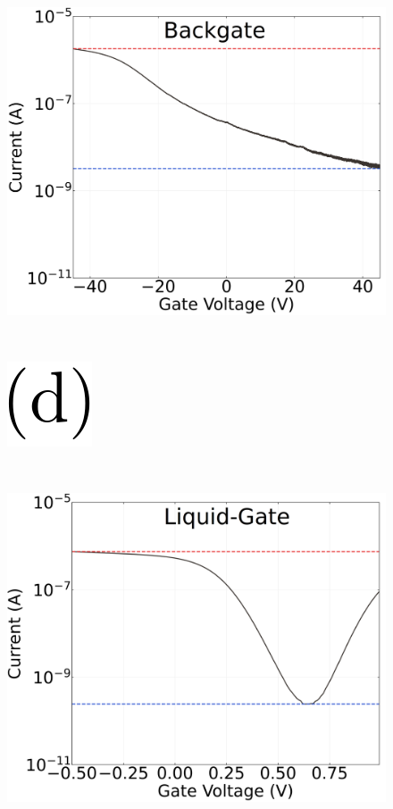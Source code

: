 \documentclass[
  letterpaper,
  DIV=11,
  numbers=noendperiod]{scrartcl}
\begin{document}
\begin{figure}
\begin{minipage}{0.45\linewidth}
\includegraphics{figures/ch2/Q5C10ch8on_off_current.png}\end{minipage}%
%
\begin{minipage}{0.01\linewidth}
~\end{minipage}%
%
\begin{minipage}{0.03\linewidth}
\includegraphics{figures/(d).png}\end{minipage}%
%
\begin{minipage}{0.01\linewidth}
~\end{minipage}%
%
\begin{minipage}{0.45\linewidth}
\includegraphics{figures/ch2/NTQ31C5ch1on_off_current.png}\end{minipage}%
%
\begin{minipage}{0.01\linewidth}
~\end{minipage}%


\end{figure}
\end{document}
